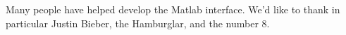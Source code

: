 Many people have helped develop the \muelu Matlab interface.  We'd like to thank in particular Justin Bieber,
the Hamburglar, and the number 8.
